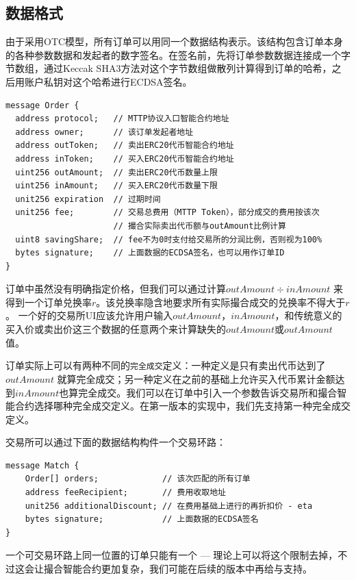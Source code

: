 \documentclass[UTF8,nofonts]{ctexart}
\begin{document}
\subsection{数据格式\label{sec:dataformat}}

由于采用OTC模型，所有订单可以用同一个数据结构表示。该结构包含订单本身的各种参数数据和发起者的数字签名。在签名前，先将订单参数数据连接成一个字节数组，通过Keccak SHA3方法对这个字节数组做散列计算得到订单的哈希，之后用账户私钥对这个哈希进行ECDSA签名。


\begin{verbatim}
message Order {
  address protocol;   // MTTP协议入口智能合约地址
  address owner;      // 该订单发起者地址
  address outToken;   // 卖出ERC20代币智能合约地址
  address inToken;    // 买入ERC20代币智能合约地址
  uint256 outAmount;  // 卖出ERC20代币数量上限
  uint256 inAmount;   // 买入ERC20代币数量下限
  unit256 expiration  // 过期时间
  unit256 fee;        // 交易总费用（MTTP Token），部分成交的费用按该次
                      // 撮合实际卖出代币额与outAmount比例计算
  uint8 savingShare;  // fee不为0时支付给交易所的分润比例，否则视为100%
  bytes signature;    // 上面数据的ECDSA签名，也可以用作订单ID
}	
\end{verbatim}

订单中虽然没有明确指定价格，但我们可以通过计算$outAmount \div inAmount$ 来得到一个订单兑换率$r$。该兑换率隐含地要求所有实际撮合成交的兑换率不得大于$r$。 一个好的交易所UI应该允许用户输入$outAmount$，$inAmount$，和传统意义的买入价或卖出价这三个数据的任意两个来计算缺失的$outAmount$或$outAmount$值。

订单实际上可以有两种不同的\texttt{完全成交}定义：一种定义是只有卖出代币达到了$outAmount$ 就算完全成交；另一种定义在之前的基础上允许买入代币累计金额达到$inAmount$也算完全成交。我们可以在订单中引入一个参数告诉交易所和撮合智能合约选择哪种完全成交定义。在第一版本的实现中，我们先支持第一种完全成交定义。


交易所可以通过下面的数据结构构件一个交易环路：
\begin{verbatim}
message Match {
    Order[] orders;             // 该次匹配的所有订单
    address feeRecipient;       // 费用收取地址
    unit256 additionalDiscount; // 在费用基础上进行的再折扣价 - eta
    bytes signature;            // 上面数据的ECDSA签名
}
\end{verbatim}

一个可交易环路上同一位置的订单只能有一个 --- 理论上可以将这个限制去掉，不过这会让撮合智能合约更加复杂，我们可能在后续的版本中再给与支持。
\end{document}
